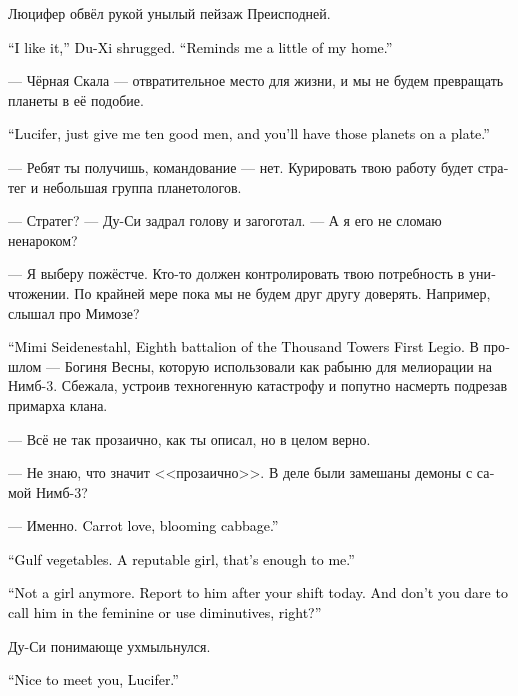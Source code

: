 \documentclass[a4paper,12pt,fleqn]{book}\usepackage{cooltooltips}\usepackage{polyglossia}\setdefaultlanguage[babelshorthands=true]{russian}\setotherlanguage{english}\defaultfontfeatures{Ligatures=TeX,Mapping=tex-text} \usepackage{xcolor}\definecolor{lightgray}{HTML}{bbbbbb}\color{lightgray}\newcommand{\ml}[3]{\textenglish{\textcolor{black}{#3}}}
\begin{document}
{Люцифер обвёл рукой унылый пейзаж Преисподней.

\ml{$0$}
{--- А мне нравится, --- пожал плечами Ду-Си.}
{``I like it,'' Du-Xi shrugged.}
\ml{$0$}
{--- Немного напоминает дом.}
{``Reminds me a little of my home.''}

--- Чёрная Скала --- отвратительное место для жизни, и мы не будем превращать планеты в её подобие.

\ml{$0$}
{--- Люцифер, просто дай мне десять толковых ребят --- и мы принесём тебе эти планеты на блюдечке.}
{``Lucifer, just give me ten good men, and you'll have those planets on a plate.''}

--- Ребят ты получишь, командование --- нет.
Курировать твою работу будет стратег и небольшая группа планетологов.

--- Стратег? --- Ду-Си задрал голову и загоготал.
--- А я его не сломаю ненароком?

--- Я выберу пожёстче.
Кто-то должен контролировать твою потребность в уничтожении.
По крайней мере пока мы не будем друг другу доверять.
Например, слышал про Мимозе?

\ml{$0$}
{--- Мими Зайденешталь, Восьмой батальон Первого легиона Тысячи Башен.}
{``Mimi Seidenestahl, Eighth battalion of the Thousand Towers First Legio.}
В прошлом --- Богиня Весны, которую использовали как рабыню для мелиорации на Нимб-3.
Сбежала, устроив техногенную катастрофу и попутно насмерть подрезав примарха клана.

--- Всё не так прозаично, как ты описал, но в целом верно.

--- Не знаю, что значит <<прозаично>>.
В деле были замешаны демоны с самой Нимб-3?

--- Именно.
\ml{$0$}
{Любовь-морковь, цветущая капуста.}
{Carrot love, blooming cabbage.''}

\ml{$0$}
{--- В бездну овощи.}
{``Gulf vegetables.}
\ml{$0$}
{Девушка с репутацией, мне этого достаточно.}
{A reputable girl, that's enough to me.''}

\ml{$0$}
{--- Уже не девушка.}
{``Not a girl anymore.}
\ml{$0$}
{Представишься ему сегодня после караула.}
{Report to him after your shift today.}
\ml{$0$}
{И не вздумай называть его в женском роде и использовать диминутивы, понял?}
{And don't you dare to call him in the feminine or use diminutives, right?''}

Ду-Си понимающе ухмыльнулся.

\ml{$0$}
{--- Приятно было познакомиться, Люцифер.}
{``Nice to meet you, Lucifer.''}

}
\end{document}
